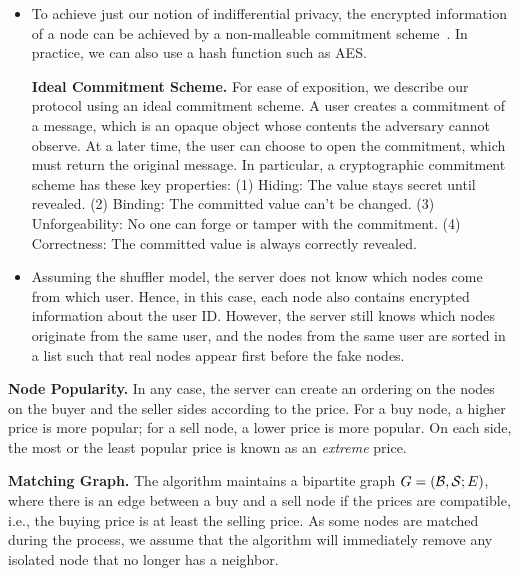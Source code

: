 \begin{itemize}

\item To achieve just our notion of indifferential privacy,
the encrypted information of a node can be achieved by 
a non-malleable commitment scheme~\cite{DBLP:journals/jacm/LinP15}.
In practice, we can also use a hash function such as AES.

\textbf{Ideal Commitment Scheme.}
For ease of exposition, we describe our protocol using
an ideal commitment scheme.  A user creates a commitment of a message,
which is an opaque object whose contents the adversary cannot observe.
At a later time, the user can choose to open the commitment, which
must return the original message. In particular, a cryptographic commitment scheme has these key properties: (1) Hiding: The value stays secret until revealed.
(2) Binding: The committed value can't be changed.
(3) Unforgeability: No one can forge or tamper with the commitment.
(4) Correctness: The committed value is always correctly revealed.




\item Assuming the shuffler model, the server does not know
which nodes come from which user.  Hence, 
in this case, each node also contains encrypted information about the user ID.
However, the server still knows which nodes originate from the same user,
and the nodes from the same user are sorted in a list such that real nodes appear 
first before the fake nodes.
\end{itemize}



\noindent \textbf{Node Popularity.}
In any case, the server can create an ordering on the nodes on the buyer and the seller sides
according to the price.
For a buy node, a higher price is more popular; for a sell node, a lower price is more popular. 
On each side, the most or the least popular price is known as an \emph{extreme} price.




\noindent \textbf{Matching Graph.}
The algorithm maintains a bipartite graph
 $G = (\mathcal {B}, \mathcal {S}; E)$,
where there is an edge between a buy and a sell node
if the prices are compatible, i.e., the buying price
is at least the selling price.
As some nodes are matched during the process,
we assume that the algorithm will immediately remove any isolated node
that no longer has a neighbor.


